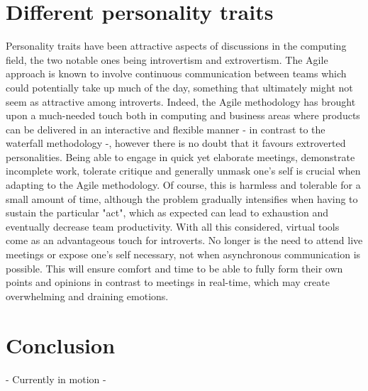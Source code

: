 \documentclass{scrartcl}
\begin{document}
\section{Different personality traits}
Personality traits have been attractive aspects of discussions in the computing field, the two notable ones being introvertism and extrovertism. The Agile approach is known to involve continuous communication between teams which could potentially take up much of the day, something that ultimately might not seem as attractive among introverts. Indeed, the Agile methodology has brought upon a much-needed touch both in computing and business areas where products can be delivered in an interactive and flexible manner - in contrast to the waterfall methodology -, however there is no doubt that it favours extroverted personalities. Being able to engage in quick yet elaborate meetings, demonstrate incomplete work, tolerate critique and generally unmask one's self is crucial when adapting to the Agile methodology. Of course, this is harmless and tolerable for a small amount of time, although the problem gradually intensifies when having to sustain the particular "act", which as expected can lead to exhaustion and eventually decrease team productivity. With all this considered, virtual tools come as an advantageous touch for introverts. No longer is the need to attend live meetings or expose one's self necessary, not when asynchronous communication is possible. This will ensure comfort and time to be able to fully form their own points and opinions in contrast to meetings in real-time, which may create overwhelming and draining emotions. 

\section{Conclusion}
- Currently in motion -



\end{document}
